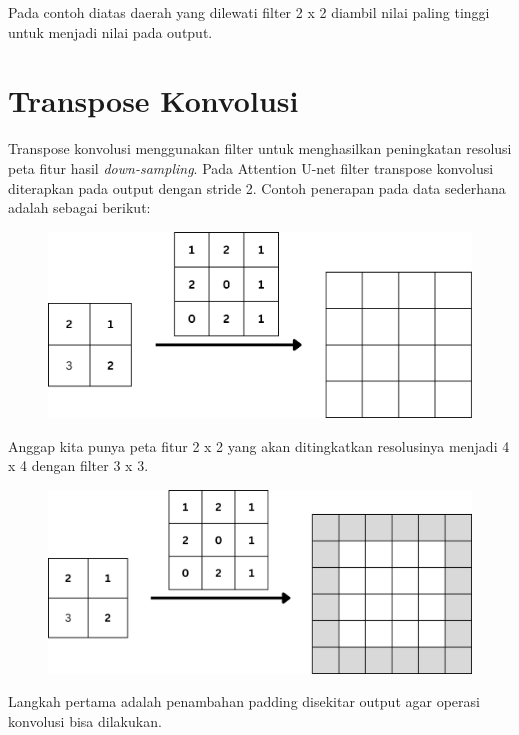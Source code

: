 \noindent Pada contoh diatas daerah yang dilewati filter 2 x 2 diambil nilai paling tinggi untuk menjadi nilai pada output.

\section{Transpose Konvolusi}

\noindent Transpose konvolusi menggunakan filter untuk menghasilkan peningkatan resolusi peta fitur hasil \textit{down-sampling}. Pada Attention U-net filter transpose konvolusi diterapkan pada output dengan stride 2. Contoh penerapan pada data sederhana adalah sebagai berikut:

\begin{figure}[H]
	\centering
	\includegraphics[scale=.3]{gambar/lampiran/dekonv-1.png}
\end{figure}

\noindent Anggap kita punya peta fitur 2 x 2 yang akan ditingkatkan resolusinya menjadi 4 x 4 dengan filter 3 x 3.

\begin{figure}[H]
	\centering
	\includegraphics[scale=.3]{gambar/lampiran/dekonv-2.png}
\end{figure}

\noindent Langkah pertama adalah penambahan padding disekitar output agar operasi konvolusi bisa dilakukan.

